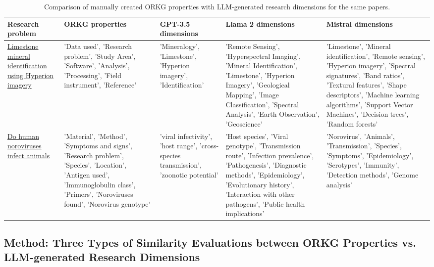\begin{table}[!htb] 
\caption{Comparison of manually created ORKG properties with LLM-generated research dimensions for the same papers.\label{table dimensions}}
\begin{tabular}{|p{1.5cm}|p{2.5cm}|p{2.0cm}|p{3cm}|p{3cm}|}
\hline
\textbf{Research problem}	& \textbf{ORKG properties}	& \textbf{GPT-3.5 dimensions}    & \textbf{Llama 2 dimensions}	& \textbf{Mistral dimensions}\\
\hline
\href{https://orkg.org/comparison/R141123/}{Limestone mineral identification using Hyperion imagery} &
'Data used', 
'Research problem', 
'Study Area', 
'Software', 
'Analysis', 
'Processing', 
'Field instrument', 
'Reference' &
'Mineralogy', 
'Limestone', 
'Hyperion imagery', 
'Identification' &
'Remote Sensing', 
'Hyperspectral Imaging', 
'Mineral Identification', 
'Limestone', 
'Hyperion Imagery', 
'Geological Mapping', 
'Image Classification', 
'Spectral Analysis', 
'Earth Observation', 
'Geoscience' &
'Limestone',
'Mineral identification',
'Remote sensing',
'Hyperion imagery',
'Spectral signatures',
'Band ratios',
'Textural features',
'Shape descriptors',
'Machine learning algorithms',
'Support Vector Machines',
'Decision trees',
'Random forests' \\

\hline
\href{https://orkg.org/comparison/R204005/}{Do human noroviruses infect animals} &
'Material', 
'Method', 
'Symptoms and signs', 
'Research problem', 
'Species', 
'Location', 
'Antigen used', 
'Immunoglobulin class', 
'Primers', 
'Noroviruses found', 
'Norovirus genotype' &
'viral infectivity', 
'host range', 
'cross-species transmission', 
'zoonotic potential' &
'Host species',
'Viral genotype',
'Transmission route',
'Infection prevalence',
'Pathogenesis',
'Diagnostic methods',
'Epidemiology',
'Evolutionary history',
'Interaction with other pathogens',
'Public health implications' &
'Norovirus',
'Animals',
'Transmission',
'Species',
'Symptoms',
'Epidemiology',
'Serotypes',
'Immunity',
'Detection methods',
'Genome analysis' \\
\hline
\end{tabular}
\end{table}

\subsection{Method: Three Types of Similarity Evaluations between ORKG Properties vs. LLM-generated Research Dimensions}

